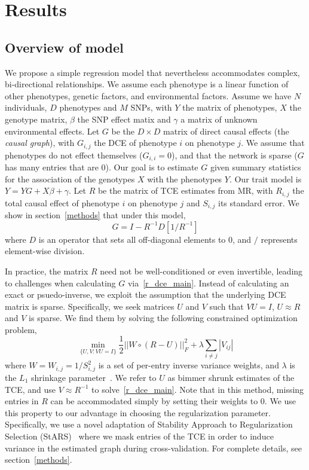 \documentclass{article}
\begin{document}
\section{Results}
\subsection*{Overview of model}
We propose a simple regression model that nevertheless accommodates complex, bi-directional relationships.
We assume each phenotype is a linear function
of other phenotypes, genetic factors, and environmental factors.
Assume we have $N$ individuals, $D$ phenotypes and $M$ SNPs,
with $Y$ the matrix of phenotypes, $X$ the genotype
matrix, $\beta$ the SNP effect matix and $\gamma$ a matrix of unknown
environmental effects. Let $G$ be the $D \times D$ matrix of
direct causal effects (the \emph{causal graph}), with $G_{i, j}$ the DCE of phenotype $i$ on
phenotype $j$. We assume that phenotypes do not effect themselves ($G_{i,i} = 0$),
and that the network is sparse ($G$ has many entries that are $0$).
Our goal is to estimate $G$ given summary statistics
 for the association of the genotypes $X$ with the phenotypes $Y$.
 Our trait model is $Y = Y G + X\beta + \gamma$.
Let $R$ be the matrix of TCE estimates from MR, with $R_{i,j}$ the total
causal effect of phenotype $i$ on phenotype $j$ and $S_{i,j}$ its standard error.
We show in section~\ref{methods} that under this model,
\begin{equation}\label{r_dce_main}
G = I - R^{-1} D[1 / R^{-1}]
\end{equation}
where $D$ is an operator that sets all off-diagonal elements to 0, and $/$
represents element-wise division.

In practice, the matrix $R$ need not be well-conditioned or
 even invertible, leading
to challenges when calculating $G$ via~\eqref{r_dce_main}. Instead of calculating an exact
or psuedo-inverse, we exploit the assumption that the underlying
DCE matrix is sparse. Specifically, we seek matrices $U$ and $V$ such that $VU=I$, $U \approx R$
and $V$ is sparse. We find them by solving the following constrained optimization problem,
\begin{equation} \label{opt_main}
\min_{\{U, V : VU = I\}} \frac{1}{2} ||W \circ (R - U)||_F^2 +
   \lambda \sum_{i\neq j}|V_{ij}|
\end{equation}
where $W = W_{i,j} = 1/S_{i,j}^2$ is a set of per-entry inverse variance weights,
and $\lambda$ is the $L_1$ shrinkage parameter~\cite{Friedman2007,Tishbirani1996}.
We refer to $U$ as bimmer shrunk estimates of the TCE, and
use $V \approx R^{-1}$ to solve~\eqref{r_dce_main}.
 Note that in this method, missing entries in $R$ can be accommodated simply
by setting their weights to 0. We use this property to our advantage in choosing the
regularization parameter. Specifically, we use a novel adaptation of Stability Approach
to Regularization Selection (StARS)~\cite{Liu2010} where we mask entries of the TCE
in order to induce variance in the estimated graph during cross-validation.
For complete details, see section~\ref{methods}.
\end{document}
